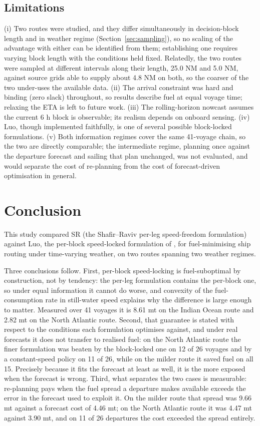 \documentclass[review,authoryear]{elsarticle}
\begin{document}
\subsection{Limitations}
\label{sec:limitations}
(i) Two routes were studied, and they differ simultaneously in decision-block length and in weather
regime (Section~\ref{sec:sampling}), so no scaling of the advantage with either can be identified from
them; establishing one requires varying block length with the conditions held fixed. Relatedly, the
two routes were sampled at different intervals along their length, 25.0 NM and 5.0 NM, against source
grids able to supply about 4.8 NM on both, so the coarser of the two under-uses the available data. (ii) The arrival constraint was hard and binding (zero slack) throughout, so results describe
fuel at equal voyage time; relaxing the ETA is left to future work. (iii) The rolling-horizon nowcast
assumes the current 6 h block is observable; its realism depends on onboard sensing. (iv) Luo, though
implemented faithfully, is one of several possible block-locked formulations. (v) Both information regimes cover the same 41-voyage chain, so the two are directly comparable; the
intermediate regime, planning once against the departure forecast and sailing that plan unchanged, was
not evaluated, and would separate the cost of re-planning from the cost of forecast-driven
optimisation in general.

\section{Conclusion}
\label{sec:conclusion}
This study compared SR (the Shafir--Raviv per-leg speed-freedom formulation) against Luo, the
per-block speed-locked formulation of \citet{luo2024}, for fuel-minimising ship routing under
time-varying weather, on two routes spanning two weather regimes.

Three conclusions follow. First, per-block speed-locking is fuel-suboptimal by construction, not by
tendency: the per-leg formulation contains the per-block one, so under equal information it cannot do
worse, and convexity of the fuel-consumption rate in still-water speed explains why the difference is
large enough to matter. Measured over 41 voyages it is 8.61 mt on the Indian Ocean route and 2.82 mt
on the North Atlantic route. Second, that guarantee is stated with respect to the conditions each
formulation optimises against, and under real forecasts it does not transfer to realised fuel: on the
North Atlantic route the finer formulation was beaten by the block-locked one on 12 of 26 voyages and
by a constant-speed policy on 11 of 26, while on the milder route it saved fuel on all 15. Precisely
because it fits the forecast at least as well, it is the more exposed when the forecast is wrong.
Third, what separates the two cases is measurable: re-planning pays when the fuel spread a departure
makes available exceeds the error in the forecast used to exploit it. On the milder route that spread
was 9.66 mt against a forecast cost of 4.46 mt; on the North Atlantic route it was 4.47 mt against
3.90 mt, and on 11 of 26 departures the cost exceeded the spread entirely.
\end{document}
